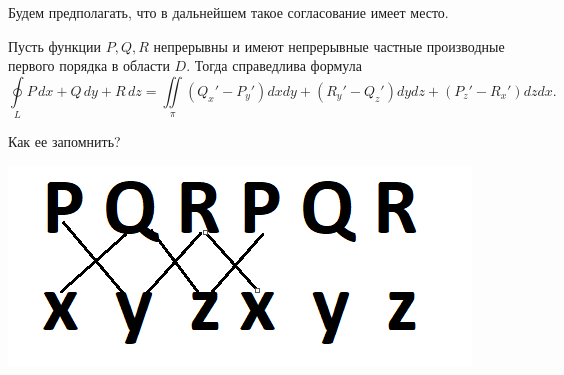 \documentclass[../../main.tex]{subfiles}
\begin{document}
	Будем предполагать, что в дальнейшем такое согласование имеет место.
	
	\begin{thm}
		Пусть функции $P,Q,R$ непрерывны и имеют непрерывные частные производные 
		первого порядка в области $D$. Тогда справедлива формула
		\[\boxed{ \oint \limits_L P \, dx + Q \, dy + R \, dz = \iint \limits_{\pi} 
		\left( Q_x' - P_y'\right)dxdy + \left( R_y' - Q_z'\right)dydz + \left( P_z' 
		- R_x'\right)dzdx. }\]
	\end{thm}
	
		Как ее запомнить?
		
		\begin{center}
			\includegraphics[scale = 0.6]{lec_25_PQR}
		\end{center}
		
\end{document}
